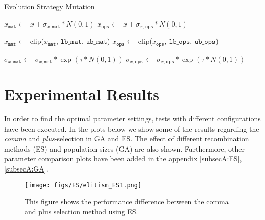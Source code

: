 \documentclass{article}
\begin{document}
\begin{algorithm}[htbp]

    \label{alg:ESmut}
    \caption{Evolution Strategy Mutation}
    \SetAlgoLined
    \DontPrintSemicolon


    \BlankLine

    $x_\texttt{mat} \gets$ $x + \sigma_{x, \texttt{mat}} * N(0, 1)$ 
    $x_\texttt{ops} \gets$ $x + \sigma_{x, \texttt{ops}} * N(0, 1)$\;

    \BlankLine
    
    $x_\texttt{mat} \gets$ clip($x_\texttt{mat}$, $\texttt{lb\_mat}$, $\texttt{ub\_mat}$) 
    $x_\texttt{ops} \gets$ clip($x_\texttt{ops}$, $\texttt{lb\_ops}$, $\texttt{ub\_ops}$)\;
    
    \BlankLine

    $\sigma_{x, \texttt{mat}} \gets$ $\sigma_{x, \texttt{mat}} * \exp{({\tau * N(0, 1)})}$ 
    $\sigma_{x, \texttt{ops}} \gets$ $\sigma_{x, \texttt{ops}} * \exp{({\tau * N(0, 1)})}$\;

    \BlankLine


\end{algorithm}
 

\section{Experimental Results}\label{sec:experi}


In order to find the optimal parameter settings, tests with different configurations have been executed. 
In the plots below we show some of the results regarding the \textit{comma} and \textit{plus}-selection in GA and ES.
The effect of different recombination methods (ES) and population sizes (GA) are also shown. 
Furthermore, other parameter comparison plots have been added in the appendix \ref{subsecA:ES}, \ref{subsecA:GA}.


\begin{figure}[H]
    \centering
    \texttt{[image: figs/ES/elitism\_ES1.png]}
    \captionsetup{width=.9\textwidth}
    \caption{This figure shows the performance difference between the comma and plus selection method using ES.}
    \label{fig:ES_commaplus}
\end{figure}
\end{document}
